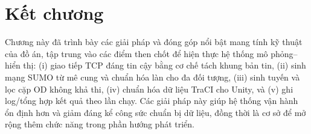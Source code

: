 \documentclass[../DoAn.tex]{subfiles}
\begin{document}
\section{Kết chương}
Chương này đã trình bày các giải pháp và đóng góp nổi bật mang tính kỹ thuật của đồ án, tập trung vào các điểm then chốt để hiện thực hệ thống mô phỏng--hiển thị: (i) giao tiếp TCP đáng tin cậy bằng cơ chế tách khung bản tin, (ii) sinh mạng SUMO từ mê cung và chuẩn hóa làn cho đa đối tượng, (iii) sinh tuyến và lọc cặp OD không khả thi, (iv) chuẩn hóa dữ liệu TraCI cho Unity, và (v) ghi log/tổng hợp kết quả theo lần chạy. Các giải pháp này giúp hệ thống vận hành ổn định hơn và giảm đáng kể công sức chuẩn bị dữ liệu, đồng thời là cơ sở để mở rộng thêm chức năng trong phần hướng phát triển.
\end{document}
